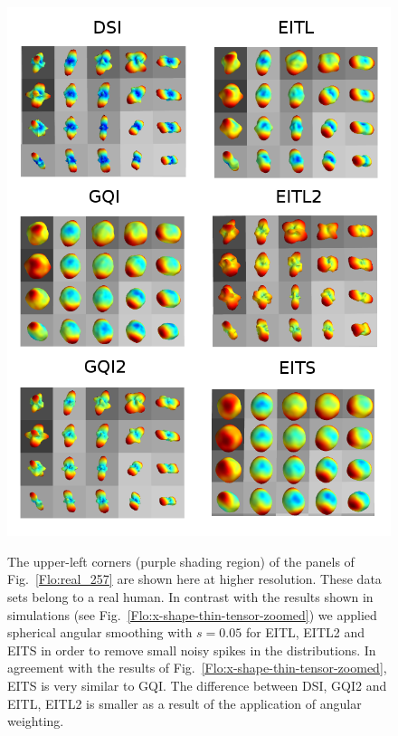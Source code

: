\documentclass{bioinfo}
\begin{document}
%
\begin{figure}
[th!]

\begin{centering}
\includegraphics[scale=1.5]{figures/real_data_257_all_grid_methods_zoomed}
\par\end{centering}

\caption{The upper-left corners (purple shading region) of the panels of Fig.~\ref{Flo:real_257}
are shown here at higher resolution. These data sets belong to a real
human. In contrast with the results shown in simulations (see Fig.~\ref{Flo:x-shape-thin-tensor-zoomed})
we applied spherical angular smoothing with $s=0.05$ for EITL, EITL2
and EITS in order to remove small noisy spikes in the distributions.
In agreement with the results of Fig.~\ref{Flo:x-shape-thin-tensor-zoomed},
EITS is very similar to GQI. The difference between DSI, GQI2 and
EITL, EITL2 is smaller as a result of the application of angular weighting.}


\centering{}\label{Flo:real_257_zoomed}
\end{figure}
\end{document}
